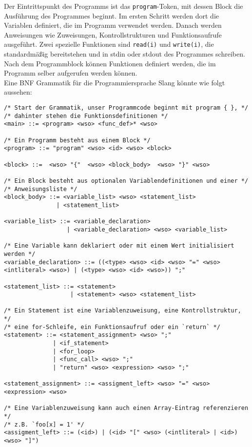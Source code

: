 Der Eintrittspunkt des Programms ist das \texttt{program}-Token, mit dessen Block die Ausführung des Programmes beginnt.
Im ersten Schritt werden dort die Variablen definiert, die im Programm verwendet werden.
Danach werden Anweisungen wie Zuweisungen, Kontrollstrukturen und Funktionsaufrufe ausgeführt.
Zwei spezielle Funktionen sind \texttt{read(i)} und \texttt{write(i)}, die standardmäßig bereitstehen und in stdin oder stdout des Programmes schreiben.
Nach dem Programmblock können Funktionen definiert werden, die im Programm selber aufgerufen werden können.\\

Eine BNF Grammatik für die Programmiersprache Slang könnte wie folgt aussehen:

  \begin{lstlisting}
/* Start der Grammatik, unser Programmcode beginnt mit program { }, */
/* dahinter stehen die Funktionsdefinitionen */
<main> ::= <program> <wso> <func_def>* <wso>

/* Ein Programm besteht aus einem Block */
<program> ::= "program" <wso> <id> <wso> <block>

<block> ::=  <wso> "{"  <wso> <block_body>  <wso> "}" <wso>

/* Ein Block besteht aus optionalen Variablendefinitionen und einer */ 
/* Anweisungsliste */
<block_body> ::= <variable_list> <wso> <statement_list>
               | <statement_list>

<variable_list> ::= <variable_declaration>
                  | <variable_declaration> <wso> <variable_list>

/* Eine Variable kann deklariert oder mit einem Wert initialisiert werden */
<variable_declaration> ::= ((<type> <wso> <id> <wso> "=" <wso> <intliteral> <wso>) | (<type> <wso> <id> <wso>)) ";"

<statement_list> ::= <statement>
                   | <statement> <wso> <statement_list>

/* Ein Statement ist eine Variablenzuweisung, eine Kontrollstruktur, */
/* eine for-Schleife, ein Funktionsaufruf oder ein `return` */
<statement> ::= <statement_assignment> <wso> ";"
              | <if_statement>
              | <for_loop>
              | <func_call> <wso> ";"
              | "return" <wso> <expression> <wso> ";"

<statement_assignment> ::= <assigment_left> <wso> "=" <wso> <expression> <wso>

/* Eine Variablenzuweisung kann auch einen Array-Eintrag referenzieren */
/* z.B. `foo[x] = 1' */
<assigment_left> ::= (<id>) | (<id> "[" <wso> (<intliteral> | <id>) <wso> "]")


\end{lstlisting}
